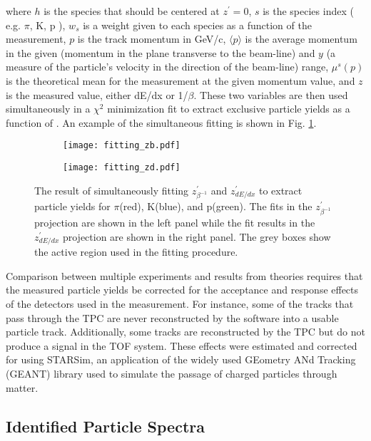 	where $h$ is the species that should be centered at $z^{\prime} = 0$, $s$ is the species index ( e.g. $\pi$, K, p ), $w_{s}$ is a weight given to each species as a function of the measurement, $p$ is the track momentum in GeV/c, $\langle p \rangle$ is the average momentum in the given \pt (momentum in the plane transverse to the beam-line) and $y$ (a measure of the particle's velocity in the direction of the beam-line) range, $\mu^{s}(p)$ is the theoretical mean for the measurement at the given momentum value, and $z$ is the measured value, either dE/dx or 1/$\beta$. These two variables are then used simultaneously in a $\chi^2$ minimization fit to extract exclusive particle yields as a function of \pt. An example of the simultaneous fitting is shown in Fig. \ref{fig:fitting}.

	\begin{figure}
		\centering 
		\begin{subfigure}[b]{0.49\textwidth} 
			\texttt{[image: fitting\_zb.pdf]}  
		\end{subfigure} 
		\begin{subfigure}[b]{0.49\textwidth} 
			\texttt{[image: fitting\_zd.pdf]} 
		\end{subfigure}

		\caption{ \label{fig:fitting} The result of simultaneously fitting $z^{\prime}_{\beta^{-1}}$ and $z^{\prime}_{dE/dx}$ to extract particle yields for $\pi$(red), K(blue), and p(green). The fits in the $z^{\prime}_{\beta^{-1}}$ projection are shown in the left panel while the fit results in the $z^{\prime}_{dE/dx}$ projection are shown in the right panel. The grey boxes show the active region used in the fitting procedure. }  
	\end{figure}

	Comparison between multiple experiments and results from theories requires that the measured particle yields be corrected for the acceptance and response effects of the detectors used in the measurement. For instance, some of the tracks that pass through the TPC are never reconstructed by the software into a usable particle track. Additionally, some tracks are reconstructed by the TPC but do not produce a signal in the TOF system. These effects were estimated and corrected for using STARSim, an application of the widely used GEometry ANd Tracking (GEANT\cite{brun_geant3_1987}) library used to simulate the passage of charged particles through matter.

	\subsection{Identified Particle Spectra}

